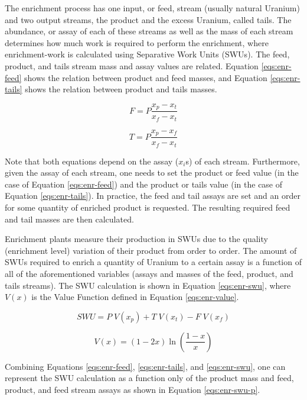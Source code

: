 The enrichment process has one input, or feed, stream (usually natural Uranium)
and two output streams, the product and the excess Uranium, called tails. The
 abundance, or assay of each of these streams as well as the mass of each stream
determines how much work is required to perform the enrichment, where
enrichment-work is calculated using Separative Work Units (SWUs). The feed,
product, and tails stream mass and assay values are related. Equation
\ref{eqs:enr-feed} shows the relation between product and feed masses, and
Equation \ref{eqs:enr-tails} shows the relation between product and tails
masses. 

\begin{equation}\label{eqs:enr-feed}
  F = P \frac{x_{p} - x_{t}}{x_{f} - x_{t}}
\end{equation}

\begin{equation}\label{eqs:enr-tails}
  T = P \frac{x_{p} - x_{f}}{x_{f} - x_{t}}
\end{equation}

Note that both equations depend on the  assay ($x_i$s) of each
stream. Furthermore, given the assay of each stream, one needs to set the
product or feed value (in the case of Equation \ref{eqs:enr-feed}) and the
product or tails value (in the case of Equation \ref{eqs:enr-tails}). In
practice, the feed and tail assays are set and an order for some quantity of
enriched product is requested. The resulting required feed and tail masses are
then calculated.

Enrichment plants measure their production in SWUs due to the quality
(enrichment level) variation of their product from order to order. The amount of
SWUs required to enrich a quantity of Uranium to a certain assay is a
function of all of the aforementioned variables (assays and masses of the
feed, product, and tails streams). The SWU calculation is shown in Equation
\ref{eqs:enr-swu}, where $V(x)$ is the Value Function defined in Equation
\ref{eqs:enr-value}.

\begin{equation}\label{eqs:enr-swu}
  SWU = P \; V(x_{p}) + T \; V(x_{t}) - F \; V(x_{f})
\end{equation}

\begin{equation}\label{eqs:enr-value}
  V(x) = (1 - 2x) \ln \left( \frac{1-x}{x} \right)
\end{equation}

Combining Equations \ref{eqs:enr-feed}, \ref{eqs:enr-tails}, and
\ref{eqs:enr-swu}, one can represent the SWU calculation as a function only of
the product mass and feed, product, and feed stream assays as shown in
Equation \ref{eqs:enr-swu-p}.

